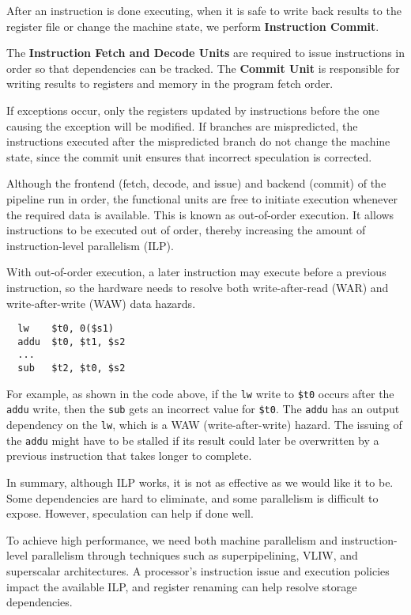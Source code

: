 After an instruction is done executing, when it is safe to write back results to the register file or change the machine state, we perform \textbf{Instruction Commit}.

The \textbf{Instruction Fetch and Decode Units} are required to issue instructions in order so that dependencies can be tracked. The \textbf{Commit Unit} is responsible for writing results to registers and memory in the program fetch order.

If exceptions occur, only the registers updated by instructions before the one causing the exception will be modified. If branches are mispredicted, the instructions executed after the mispredicted branch do not change the machine state, since the commit unit ensures that incorrect speculation is corrected.

Although the frontend (fetch, decode, and issue) and backend (commit) of the pipeline run in order, the functional units are free to initiate execution whenever the required data is available. This is known as out-of-order execution. It allows instructions to be executed out of order, thereby increasing the amount of instruction-level parallelism (ILP).

With out-of-order execution, a later instruction may execute before a previous instruction, so the hardware needs to resolve both write-after-read (WAR) and write-after-write (WAW) data hazards.

\begin{verbatim}
  lw    $t0, 0($s1)
  addu  $t0, $t1, $s2
  ... 
  sub   $t2, $t0, $s2
\end{verbatim}

For example, as shown in the code above, if the \verb|lw| write to \verb|$t0| occurs after the \verb|addu| write, then the \verb|sub| gets an incorrect value for \verb|$t0|. The \verb|addu| has an output dependency on the \verb|lw|, which is a WAW (write-after-write) hazard. The issuing of the \verb|addu| might have to be stalled if its result could later be overwritten by a previous instruction that takes longer to complete.

In summary, although ILP works, it is not as effective as we would like it to be. Some dependencies are hard to eliminate, and some parallelism is difficult to expose. However, speculation can help if done well.

To achieve high performance, we need both machine parallelism and instruction-level parallelism through techniques such as superpipelining, VLIW, and superscalar architectures. A processor's instruction issue and execution policies impact the available ILP, and register renaming can help resolve storage dependencies.
